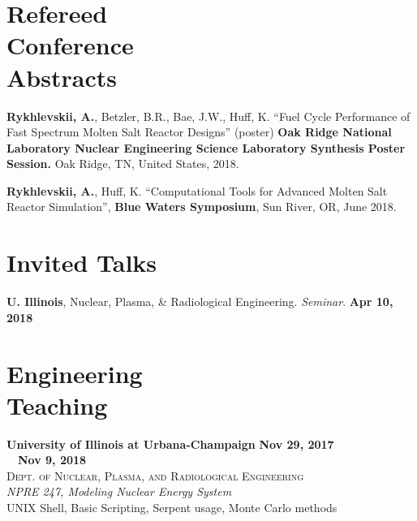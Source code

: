 \documentclass[margin,line]{resume}
\begin{document}
\begin{resume}
    \section{\mysidestyle Refereed\\Conference\\Abstracts}
    \begin{bibenum} 
	\item \textbf{Rykhlevskii, A.}, Betzler, B.R., Bae, J.W., Huff, K. ``Fuel Cycle Performance of Fast Spectrum Molten Salt Reactor Designs'' (poster)
            \textbf{Oak Ridge National Laboratory Nuclear Engineering Science Laboratory Synthesis Poster Session.} 
            Oak Ridge, TN, United States, 2018.
    \item \textbf{Rykhlevskii, A.}, Huff, K. ``Computational Tools for Advanced 
            Molten Salt Reactor Simulation'', \textbf{Blue Waters Symposium}, 
            Sun River, OR, June 2018.
	\end{bibenum}
    \section{\mysidestyle Invited Talks}
      \textbf{U. Illinois}, Nuclear, Plasma, \& Radiological Engineering. \emph{Seminar}.  \hfill\textbf{Apr 10, 2018}\\
    \section{\mysidestyle Engineering\\Teaching}
    \textbf{University of Illinois at Urbana-Champaign} \hfill \textbf{Nov 29, 2017}\\
    \mbox{ }~\hfill \textbf{Nov 9, 2018}\\
    \textsc{Dept. of Nuclear, Plasma, and Radiological Engineering}\\ 
               \textsl{NPRE 247, Modeling Nuclear Energy System}\\
               UNIX Shell, Basic Scripting, Serpent usage, Monte Carlo methods
               \vspace{2mm}

\end{resume}
\end{document}
